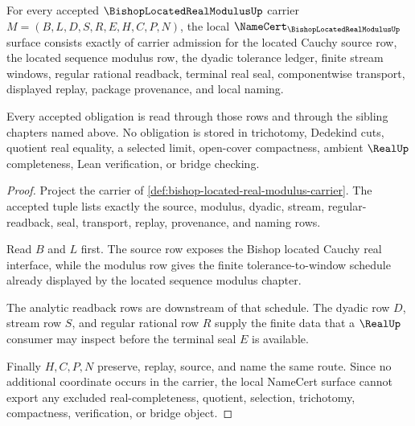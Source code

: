 \begin{theorem}
\label{thm:bishop-located-real-modulus-namecert-obligations}
For every accepted $\BishopLocatedRealModulusUp$ carrier $M=(B,L,D,S,R,E,H,C,P,N)$, the local $\NameCert_{\BishopLocatedRealModulusUp}$ surface consists exactly of carrier admission for the located Cauchy source row, the located sequence modulus row, the dyadic tolerance ledger, finite stream windows, regular rational readback, terminal real seal, componentwise transport, displayed replay, package provenance, and local naming.

Every accepted obligation is read through those rows and through the sibling chapters named above. No obligation is stored in trichotomy, Dedekind cuts, quotient real equality, a selected limit, open-cover compactness, ambient $\RealUp$ completeness, Lean verification, or bridge checking.
\end{theorem}
\begin{proof}
Project the carrier of \autoref{def:bishop-located-real-modulus-carrier}. The accepted tuple lists exactly the source, modulus, dyadic, stream, regular-readback, seal, transport, replay, provenance, and naming rows.

Read $B$ and $L$ first. The source row exposes the Bishop located Cauchy real interface, while the modulus row gives the finite tolerance-to-window schedule already displayed by the located sequence modulus chapter.

The analytic readback rows are downstream of that schedule. The dyadic row $D$, stream row $S$, and regular rational row $R$ supply the finite data that a $\RealUp$ consumer may inspect before the terminal seal $E$ is available.

Finally $H,C,P,N$ preserve, replay, source, and name the same route. Since no additional coordinate occurs in the carrier, the local NameCert surface cannot export any excluded real-completeness, quotient, selection, trichotomy, compactness, verification, or bridge object.
\end{proof}

